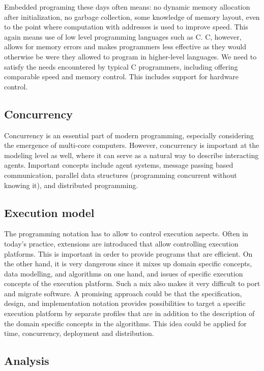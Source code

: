 Embedded programing these days often means: no dynamic memory 
allocation after initialization, no garbage collection, some 
knowledge of memory layout, even to the point where computation 
with addresses is used to improve speed. This again means use of 
low level programming languages such as C. C, however, allows for 
memory errors and makes programmers less effective as they would 
otherwise be were they allowed to program in higher-level 
languages. We need to satisfy the needs encountered by typical C 
programmers, including offering comparable speed and memory 
control. This includes support for hardware control.

\subsection{Concurrency}

Concurrency is an essential part of modern programming, especially 
considering the emergence of multi-core computers. However, 
concurrency is important at the modeling level as well, where it 
can serve as a natural way to describe interacting agents. 
Important concepts include agent systems, message passing based 
communication, parallel data structures (programming concurrent 
without knowing it), and distributed programming.

\subsection{Execution model}

The programming notation has to allow to control execution aspects. 
Often in today’s practice, extensions are introduced that allow 
controlling execution platforms. This is important in order to 
provide programs that are efficient. On the other hand, it is very 
dangerous since it mixes up domain specific concepts,  data 
modelling, and algorithms on one hand, and issues of specific 
execution concepts of the execution platform. Such a mix also makes 
it very difficult to port and migrate software. A promising 
approach could be that the specification, design, and 
implementation notation provides possibilities to target a specific 
execution platform by separate profiles that are in addition to the 
description of the domain specific concepts in the algorithms. This 
idea could be applied for time, concurrency, deployment and 
distribution.

\subsection{Analysis}

